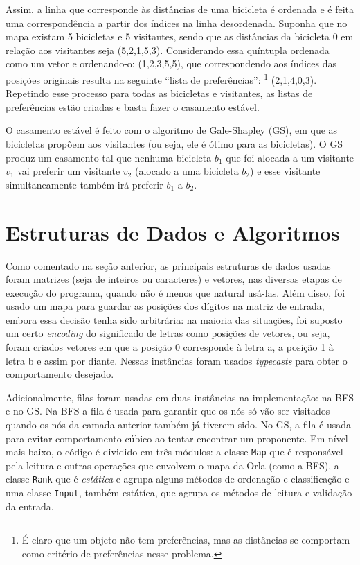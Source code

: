 \documentclass{article}
\def\code#1{\texttt{#1}}
\begin{document}
Assim, a linha que corresponde às distâncias de uma bicicleta é ordenada e é feita uma correspondência a partir dos índices na linha desordenada. Suponha que no mapa existam 5 bicicletas e 5 visitantes, sendo que as distâncias da bicicleta 0 em relação aos visitantes seja (5,2,1,5,3). Considerando essa quíntupla ordenada como um vetor e ordenando-o: (1,2,3,5,5), que correspondendo aos índices das posições originais resulta na seguinte ``lista de preferências'': \footnote{É claro que um objeto não tem preferências, mas as distâncias se comportam como critério de preferências nesse problema.} (2,1,4,0,3). Repetindo esse processo para todas as bicicletas e visitantes, as listas de preferências estão criadas e basta fazer o casamento estável.

O casamento estável é feito com o algoritmo de Gale-Shapley (GS), em que as bicicletas propõem aos visitantes (ou seja, ele é ótimo para as bicicletas). O GS produz um casamento tal que nenhuma bicicleta \( b_1 \) que foi alocada a um visitante \( v_1 \) vai preferir um visitante \( v_2 \) (alocado a uma bicicleta \( b_2 \)) e esse visitante simultaneamente também irá preferir \( b_1 \) a \( b_2 \).

\section{Estruturas de Dados e Algoritmos}

Como comentado na seção anterior, as principais estruturas de dados usadas foram matrizes (seja de inteiros ou caracteres) e vetores, nas diversas etapas de execução do programa, quando não é menos que natural usá-las. Além disso, foi usado um mapa para guardar as posições dos dígitos na matriz de entrada, embora essa decisão tenha sido arbitrária: na maioria das situações, foi suposto um certo \textit{encoding} do significado de letras como posições de vetores, ou seja, foram criados vetores em que a posição 0 corresponde à letra a, a posição 1 à letra b e assim por diante. Nessas instâncias foram usados \textit{typecasts} para obter o comportamento desejado.

Adicionalmente, filas foram usadas em duas instâncias na implementação: na BFS e no GS. Na BFS a fila é usada para garantir que os nós só vão ser visitados quando os nós da camada anterior também já tiverem sido. No GS, a fila é usada para evitar comportamento cúbico ao tentar encontrar um proponente. Em nível mais baixo, o código é dividido em três módulos: a classe \code{Map} que é responsável pela leitura e outras operações que envolvem o mapa da Orla (como a BFS), a classe \code{Rank} que é \textit{estática} e agrupa alguns métodos de ordenação e classificação e uma classe \code{Input}, também estátíca, que agrupa os métodos de leitura e validação da entrada.
\end{document}
